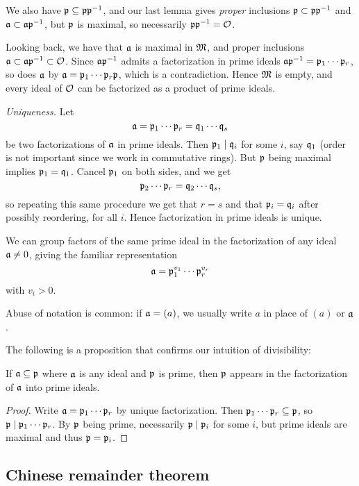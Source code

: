 We also have $\mathfrak{p}\subseteq\mathfrak{p}\mathfrak{p}^{-1}$, and our last lemma gives \emph{proper} inclusions $\mathfrak{p}\subset\mathfrak{p}\mathfrak{p}^{-1}$ and $\mathfrak{a}\subset\mathfrak{a}\mathfrak{p}^{-1}$, but $\mathfrak{p}$ is maximal, so necessarily $\mathfrak{p}\mathfrak{p}^{-1}=\mathcal{O}$.

Looking back, we have that $\mathfrak{a}$ is maximal in $\mathfrak{M}$, and proper inclusions $\mathfrak{a}\subset\mathfrak{a}\mathfrak{p}^{-1}\subset\mathcal{O}$. Since $\mathfrak{a}\mathfrak{p}^{-1}$ admits a factorization in prime ideals $\mathfrak{a}\mathfrak{p}^{-1}=\mathfrak{p}_1\cdots\mathfrak{p}_r$, so does $\mathfrak{a}$ by $\mathfrak{a}=\mathfrak{p}_1\cdots\mathfrak{p}_r\mathfrak{p}$, which is a contradiction. Hence $\mathfrak{M}$ is empty, and every ideal of $\mathcal{O}$ can be factorized as a product of prime ideals.

\emph{Uniqueness.} Let
\[
	\mathfrak{a} = \mathfrak{p}_1\cdots\mathfrak{p}_r = \mathfrak{q}_1\cdots\mathfrak{q}_s
\]
be two factorizations of $\mathfrak{a}$ in prime ideals. Then $\mathfrak{p}_1\mid\mathfrak{q}_i$ for some $i$, say $\mathfrak{q}_1$ (order is not important since we work in commutative rings). But $\mathfrak{p}$ being maximal implies $\mathfrak{p}_1=\mathfrak{q}_1$. Cancel $\mathfrak{p}_1$ on both sides, and we get
\[
	\mathfrak{p}_2\cdots\mathfrak{p}_r = \mathfrak{q}_2\cdots\mathfrak{q}_s,
\]
so repeating this same procedure we get that $r=s$ and that $\mathfrak{p}_i=\mathfrak{q}_i$ after possibly reordering, for all $i$. Hence factorization in prime ideals is unique.

We can group factors of the same prime ideal in the factorization of any ideal $\mathfrak{a}\neq 0$, giving the familiar representation
\[
	\mathfrak{a} = \mathfrak{p}_1^{v_1}\cdots\mathfrak{p}_r^{v_r}
\]
with $v_i>0$.

Abuse of notation is common: if $\mathfrak{a}=(a)$, we usually write $a$ in place of $(a)$ or $\mathfrak{a}$.

The following is a proposition that confirms our intuition of divisibility:

\begin{prop}
	If $\mathfrak{a}\subseteq\mathfrak{p}$ where $\mathfrak{a}$ is any ideal and $\mathfrak{p}$ is prime, then $\mathfrak{p}$ appears in the factorization of $\mathfrak{a}$ into prime ideals.
\end{prop}
\begin{proof}
	Write $\mathfrak{a}=\mathfrak{p}_1\cdots\mathfrak{p}_r$ by unique factorization. Then $\mathfrak{p}_1\cdots\mathfrak{p}_r\subseteq\mathfrak{p}$, so $\mathfrak{p}\mid\mathfrak{p}_1\cdots\mathfrak{p}_r$. By $\mathfrak{p}$ being prime, necessarily $\mathfrak{p}\mid\mathfrak{p}_i$ for some $i$, but prime ideals are maximal and thus $\mathfrak{p}=\mathfrak{p}_i$.
\end{proof}

\subsection{Chinese remainder theorem}

